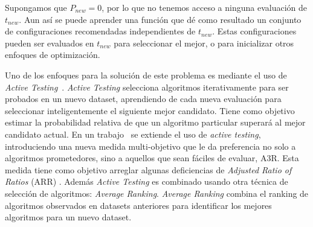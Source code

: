 
Supongamos que $P_{new} = 0$, por lo que no tenemos acceso a ninguna evaluación de $t_{new}$. Aun así se puede aprender una función que dé como resultado un conjunto de configuraciones recomendadas independientes de $t_{new}$. Estas configuraciones pueden ser evaluados en $t_{new}$ para seleccionar el mejor, o para inicializar otros enfoques de optimización.

Uno de los enfoques para la solución de este problema es mediante el uso de \textit{Active Testing}~\cite{leite2017selecting}. \textit{Active Testing} selecciona algoritmos iterativamente para ser probados en un nuevo dataset, aprendiendo de cada nueva evaluación para seleccionar inteligentemente el siguiente mejor candidato. Tiene como objetivo estimar la probabilidad relativa de que un algoritmo particular superará al mejor candidato actual. En un trabajo~\cite{abdulrahman2018speeding} se extiende el uso de \textit{active testing}, introduciendo una nueva medida multi-objetivo que le da preferencia no solo a algoritmos prometedores, sino a aquellos que sean fáciles de evaluar, A3R. Esta medida tiene como objetivo arreglar algunas deficiencias de \textit{Adjusted Ratio of Ratios} (ARR) \cite{abdulrahman2014measures}. Además \textit{Active Testing} es combinado usando otra técnica de selección de algoritmos: \textit{Average Ranking}. \textit{Average Ranking} combina el ranking de algoritmos observados en datasets anteriores para identificar los mejores algoritmos para un nuevo dataset.

